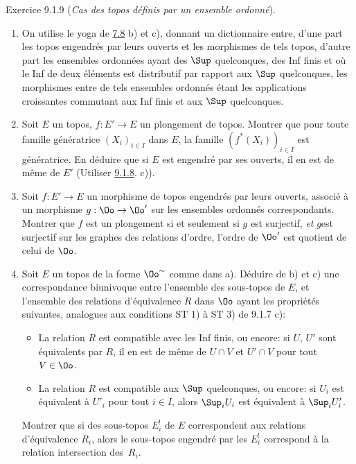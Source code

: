 \begin{enonce*}[remark]{Exercice 9.1.9}
(\emph{Cas des topos définis par un ensemble ordonné}).

\begin{enumerate}
\renewcommand{\theenumi}{\alph{enumi}}
\renewcommand{\labelenumi}{\theenumi)}
\item On utilise le yoga de \hyperref[IV.exer7.8]{7.8} b) et c), donnant un dictionnaire
entre, d'une part les topos engendrés par leurs ouverts et les
morphismes de tels topos, d'autre part les ensembles ordonnées ayant
des $\Sup$ quelconques, des Inf finis et où le Inf de deux éléments %
est distributif par rapport aux $\Sup$  quelconques, les morphismes
entre de tels ensembles ordonnés étant les applications croissantes
commutant aux Inf finis et aux $\Sup$ quelconques.

\item Soit $E$ un topos, $f:E'\rightarrow E$ un plongement de
topos. Montrer que pour toute famille génératrice $(X_i)_{i\in I}$
dans $E$, la famille $(f^{\ast}(X_i))_{i \in I}$ est génératrice. En
déduire que si $E$ est engendré par ses ouverts, il en est de même
de $E'$ (Utiliser \hyperref[IV.exer9.1.8]{9.1.8}. c)).

\item Soit $f:E'\rightarrow E$ un morphisme de topos engendrés par
leurs ouverts, associé à un morphisme $g:\Oo\rightarrow \Oo'$ sur
les ensembles ordonnés correspondants. Montrer que $f$ est un
plongement si et seulement si $g$ est surjectif, \emph{et}
$g$\pageoriginale est surjectif sur les graphes des relations
d'ordre, \ie l'ordre de $\Oo'$ est quotient de celui de $\Oo$.

\item Soit $E$ un topos de la forme $\Oo^{\sim}$ comme dans
a). Déduire de b) et c) une correspondance biunivoque entre
l'ensemble des sous-topos de $E$, et l'ensemble des relations
d'équivalence $R$ dans $\Oo$ ayant les propriétés suivantes,
analogues aux conditions ST 1) à ST 3) de 9.1.7 c):
\begin{itemize}
\item[Q0 1)] La relation $R$ est compatible avec les Inf finis, ou
encore: si $U$, $U'$ sont équivalents par $R$, il en est de même de
$U\cap V$ et $U'\cap V$ pour tout $V\in \Oo$.

\item[Q0 2)] La relation $R$ est compatible aux $\Sup$ quelconques,
ou encore: si $U_i$ est équivalent à $U'_i$ pour tout $i\in I$,
alors $\Sup_i U_i$ est équivalent à $\Sup_i U'_i$.
\end{itemize}

Montrer que si des sous-topos $E^{!}_i$ de $E$ correspondent aux
relations d'équivalence $R_i$, alors le sous-topos engendré par les
$E^{!}_i$ correspond à la relation intersection des~$R_i$.
\end{enumerate}
\end{enonce*}

